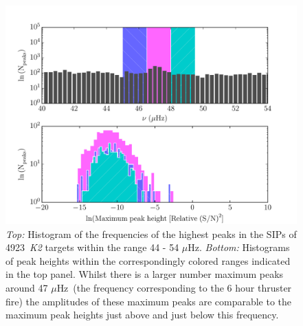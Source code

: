 \documentclass[useAMS, usenatbib, preprint, 12pt]{aastex}
\newcommand{\nGO}{4923}
\newcommand{\uHz}{$\mu$Hz}
\begin{document}
\begin{figure}[h]
\begin{center}
\includegraphics[width=6in, clip=true]{sip_hist.pdf}
\caption{{\it Top:} Histogram of the frequencies of the highest peaks in the
	SIPs of \nGO\ {\it K2} targets within the range 44 - 54 \uHz.
	{\it Bottom:} Histograms of peak heights within the correspondingly
	colored ranges indicated in the top panel.
	Whilst there is a larger number maximum peaks around 47 \uHz\ (the
	frequency corresponding to the 6 hour thruster fire) the amplitudes of
	these maximum peaks are comparable to the maximum peak heights just
	above and just below this frequency.}
\label{fig:sip_hist}
\end{center}
\end{figure}
\end{document}

